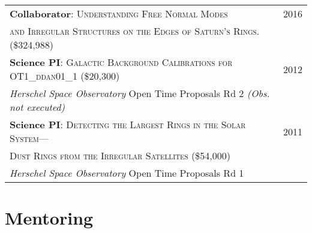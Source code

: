 \documentclass[10pt]{article} %
\begin{document}
\begin{tabular}{l>{\hfill}p{2.3cm}}
{\bf Collaborator}: \textsc{Understanding Free Normal Modes} & 2016 \\
\textsc{ and Irregular Structures on the Edges of Saturn's Rings.} \footnotesize(\$324,988)\normalsize \\
{\bf Science PI}: \textsc{Galactic Background Calibrations for OT1\_ddan01\_1} \footnotesize(\$20,300)\normalsize & 2012 \\
{\it Herschel Space Observatory} Open Time Proposals Rd 2 {\it (Obs. not executed)} \\
{\bf Science PI}: \textsc{Detecting the Largest Rings in the Solar System---} & 2011 \\ 
\textsc{Dust Rings from the Irregular Satellites} \footnotesize(\$54,000)\normalsize \\
{\it Herschel Space Observatory} Open Time Proposals Rd 1 \\
\end{tabular}


\section{Mentoring}
\end{document}
